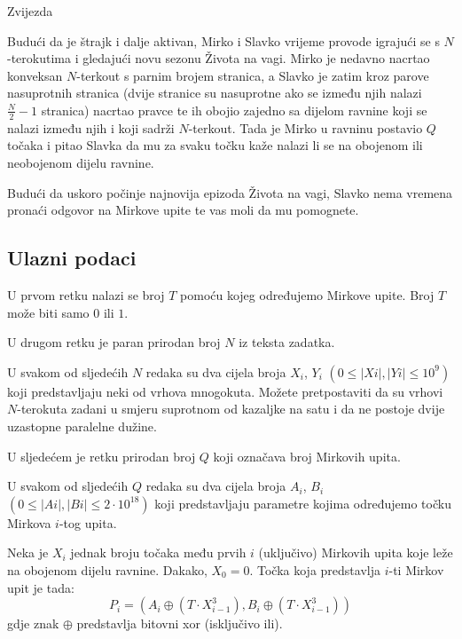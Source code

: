 \begin{statement}[
  problempoints=110,
  timelimit=1 sekunda,
  memorylimit=512 MiB,
]{Zvijezda}

Budući da je štrajk i dalje aktivan, Mirko i Slavko vrijeme provode igrajući se
s $N$-terokutima i gledajući novu sezonu Života na vagi. Mirko je nedavno
nacrtao konveksan $N$-terkout s parnim brojem stranica, a Slavko je zatim
kroz parove nasuprotnih stranica (dvije stranice su nasuprotne ako se između
njih nalazi $\frac{N}{2}-1$ stranica) nacrtao pravce te ih obojio zajedno sa
dijelom ravnine koji se nalazi između njih i koji sadrži $N$-terkout. Tada je
Mirko u ravninu postavio $Q$ točaka i pitao Slavka da mu za svaku točku kaže
nalazi li se na obojenom ili neobojenom dijelu ravnine.

Budući da uskoro počinje najnovija epizoda Života na vagi, Slavko nema vremena
pronaći odgovor na Mirkove upite te vas moli da mu pomognete.

\subsection*{Ulazni podaci}
U prvom retku nalazi se broj $T$ pomoću kojeg određujemo Mirkove upite. Broj
$T$ može biti samo $0$ ili $1$.

U drugom retku je paran prirodan broj $N$ iz teksta zadatka.

U svakom od sljedećih $N$ redaka su dva cijela broja $X_i$, $Y_i$
$(0 \le |Xi|, |Yi| \le 10^9)$
koji predstavljaju neki od vrhova mnogokuta. Možete pretpostaviti
da su vrhovi $N$-terokuta zadani u smjeru suprotnom od kazaljke na satu i da ne
postoje dvije uzastopne paralelne dužine.

U sljedećem je retku prirodan broj $Q$ koji označava broj Mirkovih upita.

U svakom od sljedećih $Q$ redaka su dva cijela broja $A_i$, $B_i$
$(0 \le |Ai|, |Bi| \le 2\cdot10^{18})$ koji predstavljaju parametre kojima
određujemo točku Mirkova $i$-tog upita.

Neka je $X_i$ jednak broju točaka među prvih $i$ (uključivo) Mirkovih upita
koje leže na obojenom dijelu ravnine. Dakako, $X_0=0$. Točka koja predstavlja
$i$-ti Mirkov upit je tada:
\[P_i = (A_i \oplus (T \cdot X_{i-1}^{3}), B_i \oplus (T \cdot X_{i-1}^{3}))\]
gdje znak $\oplus$ predstavlja bitovni xor (isključivo ili).


\end{statement}
